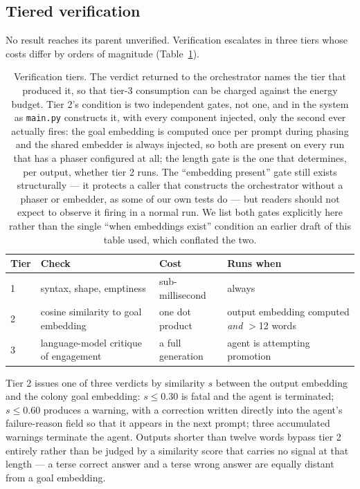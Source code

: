 \documentclass[11pt]{article}
\begin{document}
\subsection{Tiered verification}
\label{sec:judge}

No result reaches its parent unverified. Verification escalates in three tiers
whose costs differ by orders of magnitude (Table~\ref{tab:tiers}).

\begin{table}[t]
\centering
\begin{tabular}{@{}llll@{}}
\toprule
Tier & Check & Cost & Runs when \\
\midrule
1 & syntax, shape, emptiness              & sub-millisecond    & always \\
2 & cosine similarity to goal embedding   & one dot product    & output embedding computed \emph{and} $>$12 words \\
3 & language-model critique of engagement & a full generation  & agent is attempting promotion \\
\bottomrule
\end{tabular}
\caption{Verification tiers. The verdict returned to the orchestrator names the
tier that produced it, so that tier-3 consumption can be charged against the
energy budget. Tier 2's condition is two independent gates, not one, and in
the system as \texttt{main.py} constructs it, with every component injected,
only the second ever actually fires: the goal embedding is computed once per
prompt during phasing
and the shared embedder is always injected, so both are present on every run
that has a phaser configured at all; the length gate is the one that
determines, per output, whether tier 2 runs. The ``embedding present'' gate
still exists structurally --- it protects a caller that constructs the
orchestrator without a phaser or embedder, as some of our own tests do --- but
readers should not expect to observe it firing in a normal run. We list both
gates explicitly here rather than the single ``when embeddings exist''
condition an earlier draft of this table used, which conflated the two.}
\label{tab:tiers}
\end{table}

Tier 2 issues one of three verdicts by similarity $s$ between the output
embedding and the colony goal embedding: $s \le 0.30$ is fatal and the agent is
terminated; $s \le 0.60$ produces a warning, with a correction written directly
into the agent's failure-reason field so that it appears in the next prompt;
three accumulated warnings terminate the agent. Outputs shorter than twelve
words bypass tier 2 entirely rather than be judged by a similarity score that
carries no signal at that length --- a terse correct answer and a terse wrong
answer are equally distant from a goal embedding.
\end{document}

